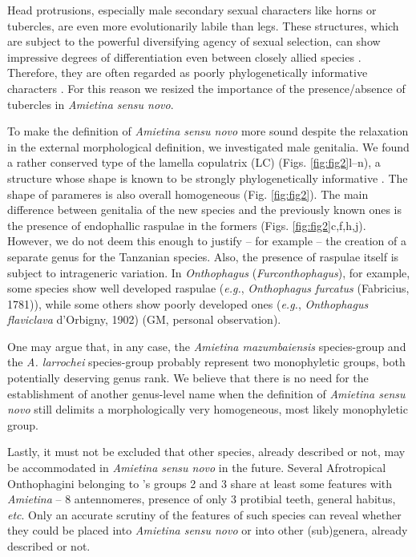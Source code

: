 \documentclass[fleqn,10pt,lineno]{wlpeerj}
\begin{document}
Head protrusions, especially male secondary sexual characters like horns or tubercles, are even more evolutionarily labile than legs. These structures, which are subject to the powerful diversifying agency of sexual selection, can show impressive degrees of differentiation even between closely allied species \citep{emlen2005diversity}. Therefore, they are often regarded as poorly phylogenetically informative characters \citep{tarasov2011phylogenetic}. For this reason we resized the importance of the presence/absence of tubercles in \textit{Amietina sensu novo}.

To make the definition of \textit{Amietina sensu novo} more sound despite the relaxation in the external morphological definition, we investigated male genitalia. We found a rather conserved type of the lamella copulatrix (LC) (Figs. \ref{fig:fig2}l--n), a structure whose shape is known to be strongly phylogenetically informative \citep{tarasov2011phylogenetic}. The shape of parameres is also overall homogeneous (Fig. \ref{fig:fig2}). The main difference between genitalia of the new species and the previously known ones is the presence of endophallic raspulae in the formers (Figs. \ref{fig:fig2}c,f,h,j). However, we do not deem this enough to justify -- for example -- the creation of a separate genus for the Tanzanian species. Also, the presence of raspulae itself is subject to intrageneric variation. In \textit{Onthophagus} (\textit{Furconthophagus}), for example, some species show well developed raspulae (\textit{e.g.}, \textit{Onthophagus furcatus} (Fabricius, 1781)), while some others show poorly developed ones (\textit{e.g.}, \textit{Onthophagus flaviclava} d’Orbigny, 1902) (GM, personal observation). 

One may argue that, in any case, the \textit{Amietina mazumbaiensis} species-group and the \textit{A. larrochei} species-group probably represent two monophyletic groups, both potentially deserving genus rank. We believe that there is no need for the establishment of another genus-level name when the definition of \textit{Amietina sensu novo} still delimits a morphologically very homogeneous, most likely monophyletic group.

Lastly, it must not be excluded that other species, already described or not, may be accommodated in \textit{Amietina sensu novo} in the future. Several Afrotropical Onthophagini belonging to \cite{orbigny1913synopsis}'s groups 2 and 3 share at least some features with \textit{Amietina} -- 8 antennomeres, presence of only 3 protibial teeth, general habitus, \textit{etc}. Only an accurate scrutiny of the features of such species can reveal whether they could be placed into \textit{Amietina sensu novo} or into other (sub)genera, already described or not.
\end{document}
